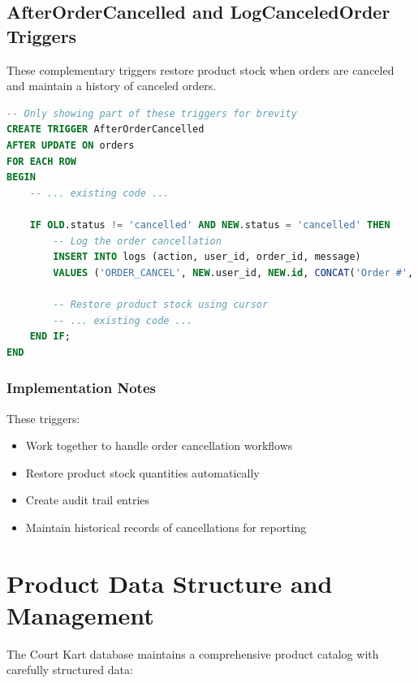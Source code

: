 \documentclass[13pt,a4paper]{article}
\begin{document}
\subsection{AfterOrderCancelled and LogCanceledOrder Triggers}
These complementary triggers restore product stock when orders are canceled and maintain a history of canceled orders.

\begin{lstlisting}[language=SQL]
-- Only showing part of these triggers for brevity
CREATE TRIGGER AfterOrderCancelled
AFTER UPDATE ON orders
FOR EACH ROW
BEGIN
    -- ... existing code ...
    
    IF OLD.status != 'cancelled' AND NEW.status = 'cancelled' THEN
        -- Log the order cancellation
        INSERT INTO logs (action, user_id, order_id, message)
        VALUES ('ORDER_CANCEL', NEW.user_id, NEW.id, CONCAT('Order #', NEW.id, ' canceled'));
        
        -- Restore product stock using cursor
        -- ... existing code ...
    END IF;
END
\end{lstlisting}

\subsubsection{Implementation Notes}
These triggers:
\begin{itemize}
	\item Work together to handle order cancellation workflows
	\item Restore product stock quantities automatically
	\item Create audit trail entries
	\item Maintain historical records of cancellations for reporting
\end{itemize}

\section{Product Data Structure and Management}

The Court Kart database maintains a comprehensive product catalog with carefully structured data:
\end{document}
